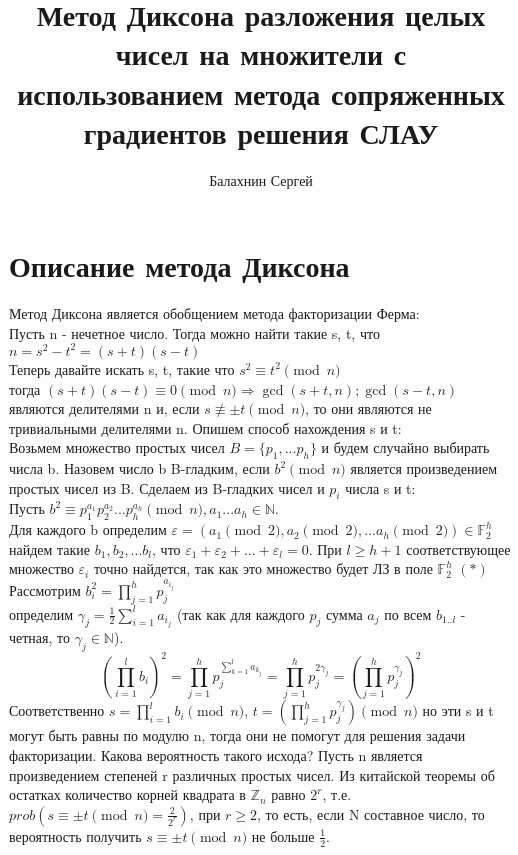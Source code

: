 \documentclass[14pt,a4paper,]{article}
\title{Метод Диксона разложения целых чисел на множители с использованием метода сопряженных градиентов решения СЛАУ }
\date{}
\author{Балахнин Сергей}
\newcommand{\N}{\mathbb{N}}   %
\newcommand{\Z}{\mathbb{Z}}   %
\newcommand{\F}{\mathbb{F}}   %
\def\EPS{\varepsilon}         %
\def\SO{\Rightarrow}          %
\begin{document}
\maketitle
\section{Описание метода Диксона}
Метод Диксона является обобщением метода факторизации Ферма:\\
Пусть n - нечетное число. Тогда можно найти такие s, t, что $n = s^2 - t^2 = (s+t)(s - t)$ \\
Теперь давайте искать s, t, такие что $s ^ 2 \equiv t^ 2 \pmod{n}$\\
тогда $ (s + t)(s - t) \equiv 0 \pmod{n}  \SO \gcd(s + t, n); \gcd(s - t, n)$ являются делителями n и, если $ s \not\equiv \pm t \pmod{n}$, то они являются не тривиальными делителями n. 
Опишем способ нахождения s и t:\\
Возьмем множество простых чисел  $B = \{ p_1, ... p_h\}$ и будем случайно выбирать числа b.
Назовем число b B-гладким, если $ b^2 \pmod n$ является произведением простых чисел из B.
Сделаем из B-гладких чисел и $p_i$ числа s и t:\\
Пусть $b^2 \equiv p_1^{a_1} p_2^{a_2} ... p_h^{a_h} \pmod{n}, a_1...a_h \in \N$.\\
Для каждого b определим $\EPS = (a_1 \pmod 2, a_2 \pmod 2, ... a_h \pmod 2) \in \F_2^h$ 
найдем такие $b_1, b_2, ... b_l$, что $\EPS_1 + \EPS_2 + ... +\EPS_l = 0$. При $l \geq h+1 $ соответствующее множество $\EPS_i$ точно найдется, так как это множество будет ЛЗ в поле $\F_2^h$ \hfill $(*)$\\
Рассмотрим $b_i^2 = \prod_{j = 1}^{h} p_j^{a_{i}_{j}}$\\
определим $\gamma_j = \frac{1}{2} \sum_{i=1}^{l} a_{i}_{j}$ (так как для каждого $p_j$ сумма $a_j$ по всем $b_{1..l}$ - четная, то $\gamma_j \in \N$).\\

$$(\prod_{i = 1}^{l} b_i) ^ 2 =\prod_{j=1}^{h}p_j^{\sum_{k = 1}^{l} a_{k}_{j}} =  \prod_{j = 1}^{h} p_j^{2\gamma_j} = (\prod_{j = 1}^{h} p_j^{\gamma_j})^2$$
Соответственно $s = \prod_{i = 1}^{l} b_i \pmod n $, $t = (\prod_{j = 1}^{h} p_j^{\gamma_j}) \pmod n$
но эти s и t могут быть равны по модулю n, тогда они не помогут для решения задачи факторизации.
Какова вероятность такого исхода? Пусть n является произведением степеней r различных простых чисел. Из китайской теоремы об остатках количество корней квадрата в $\Z_n$ равно $2^r$, т.е. $prob(s \equiv \pm t \pmod n = \frac{2}{2^r})$, при $r \geq 2$, то есть, если N составное число, то вероятность получить $s \equiv \pm t \pmod n$ не больше  $\frac{1}{2}$.
\end{document}
